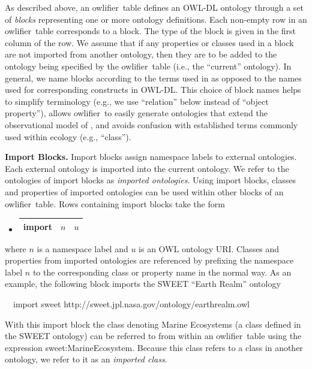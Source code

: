 \documentclass[preprint,number]{elsarticle}
\newcommand{\owlifier}{\textsf{owlifier}}
\newcommand{\myblock}[1]{\vspace{12pt}\noindent\textbf{#1}}
\begin{document}
As described above, an \owlifier\ table defines an OWL-DL
\cite{smith04:_owl_web_ontol_languag_guide} ontology through a set of
\emph{blocks} representing one or more ontology definitions.  Each
non-empty row in an \owlifier\ table corresponds to a block. The type
of the block is given in the first column of the row. 
We assume that if any properties or classes used in a block are not
imported from another ontology, then they are to be added to the
ontology being specified by the \owlifier\ table (i.e., the
``current'' ontology). In general, we name blocks according to the
terms used in
\cite{bowers08:_concep_model_framew_for_expres,madin07:_ontol_for_descr_and_synth}
as opposed to the names used for corresponding constructs in
OWL-DL. This choice of block names helps to simplify terminology
(e.g., we use ``relation'' below instead of ``object property''),
allows \owlifier\ to easily generate ontologies that extend the
observational model of
\cite{bowers08:_concep_model_framew_for_expres,madin07:_ontol_for_descr_and_synth},
and avoids confusion with established terms commonly used within
ecology (e.g., ``class''). 

\myblock{Import Blocks.} Import blocks assign namespace labels to
external ontologies. Each external ontology is imported into the
current ontology. We refer to the ontologies of import blocks as
\emph{imported ontologies}.  Using import blocks, classes and
properties of imported ontologies can be used within other blocks of
an \owlifier\ table.  Rows containing import blocks take the form
\begin{itemize}
\item[]
  \begin{tabular}{|l|l|l|}\hline
    \textsf{import} & $n$ & $u$ \\ \hline 
  \end{tabular} 
\end{itemize}
where $n$ is a namespace label and $u$ is an OWL ontology URI. Classes
and properties from imported ontologies are referenced by prefixing
the namespace label $n$ to the corresponding class or property name in
the normal way. As an example, the following block imports the SWEET
``Earth Realm'' ontology \cite{raskin:_seman_web_for_earth_and}
\begin{tabbing}
  ~~\textsf{import}  \textsf{sweet} 
  \textsf{http://sweet.jpl.nasa.gov/ontology/earthrealm.owl}
\end{tabbing}
With this import block the class denoting Marine Ecosystems (a class
defined in the SWEET ontology) can be referred to from within an
\owlifier\ table using the expression
\textsf{sweet:MarineEcosystem}. Because this class refers to a class
in another ontology, we refer to it as an \emph{imported class}.
\end{document}
